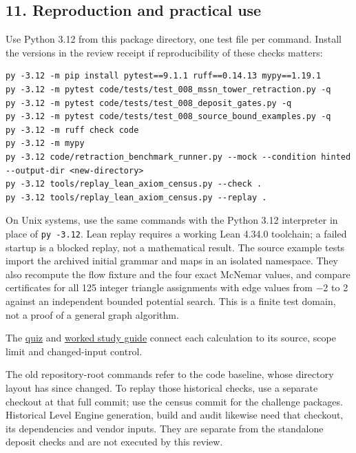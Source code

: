 \documentclass[
  11pt,
]{article}
\newcommand{\passthrough}[1]{#1}
\begin{document}
\hypertarget{reproduction-and-practical-use}{%
\subsection{11. Reproduction and practical
use}\label{reproduction-and-practical-use}}

Use Python 3.12 from this package directory, one test file per command.
Install the versions in the review receipt if reproducibility of these
checks matters:

\begin{lstlisting}
py -3.12 -m pip install pytest==9.1.1 ruff==0.14.13 mypy==1.19.1
py -3.12 -m pytest code/tests/test_008_mssn_tower_retraction.py -q
py -3.12 -m pytest code/tests/test_008_deposit_gates.py -q
py -3.12 -m pytest code/tests/test_008_source_bound_examples.py -q
py -3.12 -m ruff check code
py -3.12 -m mypy
py -3.12 code/retraction_benchmark_runner.py --mock --condition hinted --output-dir <new-directory>
py -3.12 tools/replay_lean_axiom_census.py --check .
py -3.12 tools/replay_lean_axiom_census.py --replay .
\end{lstlisting}

On Unix systems, use the same commands with the Python 3.12 interpreter
in place of \passthrough{\lstinline!py -3.12!}. Lean replay requires a
working Lean 4.34.0 toolchain; a failed startup is a blocked replay, not
a mathematical result. The source example tests import the archived
initial grammar and maps in an isolated namespace. They also recompute
the flow fixture and the four exact McNemar values, and compare
certificates for all 125 integer triangle assignments with edge values
from −2 to 2 against an independent bounded potential search. This is a
finite test domain, not a proof of a general graph algorithm.

The
\href{https://github.com/dbccpage/the_symbol_game/blob/main/omega_engine_education/documentation/030_pfp_proposal_fidelity_protocol_pfp/papers/omega_engine_symbol_game/008_pfp_mssn_tower_challenges_and_retraction_benchmarks/_lev_landau_theoretical_minimum_quiz/quiz.md}{quiz}
and
\href{https://github.com/dbccpage/the_symbol_game/blob/main/omega_engine_education/documentation/030_pfp_proposal_fidelity_protocol_pfp/papers/omega_engine_symbol_game/008_pfp_mssn_tower_challenges_and_retraction_benchmarks/_lev_landau_theoretical_minimum_quiz/study_guide.md}{worked
study guide} connect each calculation to its source, scope limit and
changed-input control.

The old repository-root commands refer to the code baseline, whose
directory layout has since changed. To replay those historical checks,
use a separate checkout at that full commit; use the census commit for
the challenge packages. Historical Level Engine generation, build and
audit likewise need that checkout, its dependencies and vendor inputs.
They are separate from the standalone deposit checks and are not
executed by this review.
\end{document}
